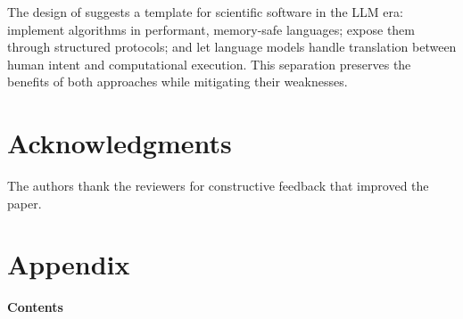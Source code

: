 The design of  suggests a template for scientific
software in the LLM era: implement algorithms in performant, memory-safe languages;
expose them through structured protocols; and let language models handle
translation between human intent and computational execution. This separation
preserves the benefits of both approaches while mitigating their weaknesses.



\section*{Acknowledgments}

The authors thank the reviewers for constructive feedback that improved the paper.



\clearpage
\appendix

\renewcommand{\thetable}{\Alph{section}.\arabic{table}}
\renewcommand{\thefigure}{\Alph{section}.\arabic{figure}}

\section*{Appendix}

\vspace{1em}
\noindent\textbf{Contents}
\vspace{0.5em}

